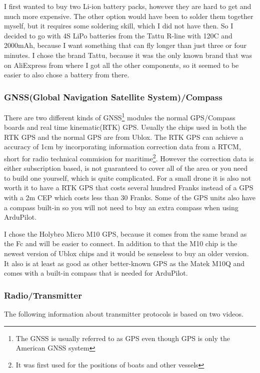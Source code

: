 \documentclass{article}
\begin{document}
	I first wanted to buy two Li-ion battery packs, however they are hard to get and much more expensive. The other option would have been to solder them together myself, but it requires some soldering skill, which I did not have then. So I decided to go with 4S LiPo batteries from the Tattu R-line with 120C and 2000mAh\cite{tattu}, because I want something that can fly longer than just three or four minutes. I chose the brand Tattu, because it was the only known brand that was on AliExpress from where I got all the other components, so it seemed to be easier to also chose a battery from there. 
	
	\subsubsection{GNSS(Global Navigation Satellite System)/Compass}
	There are two different kinds of GNSS\footnote{The GNSS is usually referred to as GPS even though GPS is only the American GNSS system} modules the normal GPS/Compass boards and real time kinematic(RTK) GPS. Usually the chips used in both the RTK GPS and the normal GPS are from Ublox. The RTK GPS can achieve a accuracy of 1cm by incorporating information correction data from a RTCM, short for radio technical commision for maritime\footnote{It was first used for the positions of boats and other vessels}. However the correction data is either subscription based, is not guaranteed to cover all of the area or you need to build one yourself, which is quite complicated\cite{rtkgps}. For a small drone it is also not worth it to have a RTK GPS that costs several hundred Franks instead of a GPS with a 2m CEP which costs less than 30 Franks. Some of the GPS units also have a compass built-in so you will not need to buy an extra compass when using ArduPilot. 
	
	I chose the Holybro Micro M10 GPS\cite{holybrom10micro}, because it comes from the same brand as the Fc and will be easier to connect. In addition to that the M10 chip is the newest version of Ublox chips and it would be senseless to buy an older version. It also is at least as good as other better-known GPS as the Matek M10Q\cite{gpstest} and comes with a built-in compass that is needed for ArduPilot.

	\subsubsection{Radio/Transmitter}
	The following information about transmitter protocols is based on two videos\cite{transprotocols}\cite{mlrs}.
\end{document}
